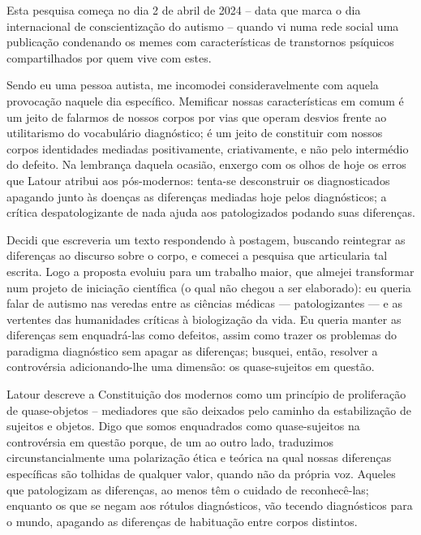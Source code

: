 


Esta pesquisa começa no dia 2 de abril de 2024 -- data que marca o dia internacional de conscientização do autismo -- quando vi numa rede social uma publicação condenando os memes com características de transtornos psíquicos compartilhados por quem vive com estes.

Sendo eu uma pessoa autista, me incomodei consideravelmente com aquela provocação naquele dia específico. Memificar nossas características em comum é um jeito de falarmos de nossos corpos por vias que operam desvios frente ao utilitarismo do vocabulário diagnóstico; é um jeito de constituir com nossos corpos identidades mediadas positivamente, criativamente, e não pelo intermédio do defeito. Na lembrança daquela ocasião, enxergo com os olhos de hoje os erros que Latour atribui aos pós-modernos: tenta-se desconstruir os diagnosticados apagando junto às doenças as diferenças mediadas hoje pelos diagnósticos; a crítica despatologizante de nada ajuda aos patologizados podando suas diferenças.

Decidi que escreveria um texto respondendo à postagem, buscando reintegrar as diferenças ao discurso sobre o corpo, e comecei a pesquisa que articularia tal escrita. Logo a proposta evoluiu para um trabalho maior, que almejei transformar num projeto de iniciação científica (o qual não chegou a ser elaborado): eu queria falar de autismo nas veredas entre as ciências médicas --- patologizantes --- e as vertentes das humanidades críticas à biologização da vida. Eu queria manter as diferenças sem enquadrá-las como defeitos, assim como trazer os problemas do paradigma diagnóstico sem apagar as diferenças; busquei, então, resolver a controvérsia adicionando-lhe uma dimensão: os quase-sujeitos em questão.

Latour descreve a Constituição dos modernos como um princípio de proliferação de quase-objetos -- mediadores que são deixados pelo caminho da estabilização de sujeitos e objetos. Digo que somos enquadrados como quase-sujeitos na controvérsia em questão porque, de um ao outro lado, traduzimos circunstancialmente uma polarização ética e teórica na qual nossas diferenças específicas são tolhidas de qualquer valor, quando não da própria voz. Aqueles que patologizam as diferenças, ao menos têm o cuidado de reconhecê-las; enquanto os que se negam aos rótulos diagnósticos, vão tecendo diagnósticos para o mundo, apagando as diferenças de habituação entre corpos distintos.

